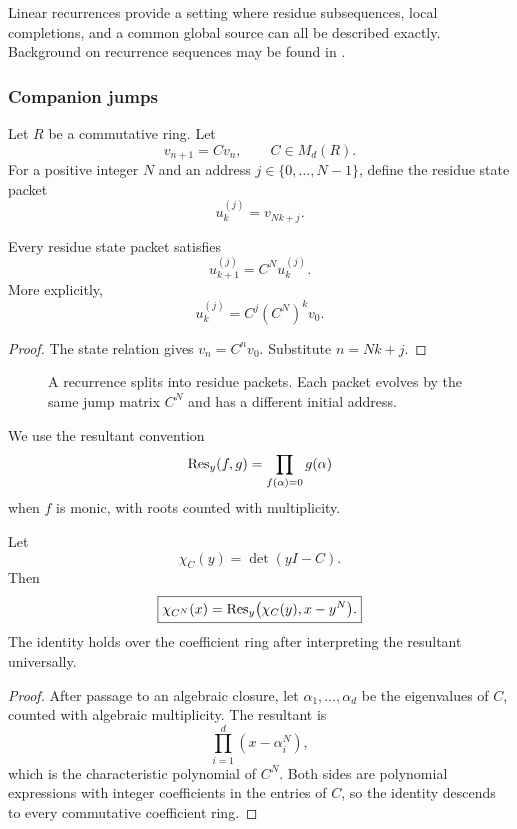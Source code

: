 Linear recurrences provide a setting where residue subsequences, local completions, and a common global source can all be described exactly. Background on recurrence sequences may be found in \cite{EverestVanDerPoortenShparlinskiWard2003,Stanley2012}.

\subsubsection{Companion jumps}

Let \(R\) be a commutative ring. Let
\[
v_{n+1}=Cv_n,
\qquad
C\in M_d(R).
\]
For a positive integer \(N\) and an address \(j\in\{0,\ldots,N-1\}\), define the residue state packet
\[
u_k^{(j)}=v_{Nk+j}.
\]

\begin{histtheorem}\label{hist:thm:companion_jump}
Every residue state packet satisfies
\[
\boxed{
u_{k+1}^{(j)}=C^Nu_k^{(j)}.}
\]
More explicitly,
\[
\boxed{
u_k^{(j)}=C^j(C^N)^kv_0.}
\]
\end{histtheorem}

\begin{proof}
The state relation gives \(v_n=C^nv_0\). Substitute \(n=Nk+j\).
\end{proof}

\begin{figure}[t]
\centering
{}
\caption{A recurrence splits into residue packets. Each packet evolves by the same jump matrix \(C^N\) and has a different initial address.}
\label{hist:fig:recurrence_packets}
\end{figure}

We use the resultant convention
\[
\operatorname{Res}_y(f,g)
=
\prod_{f(\alpha)=0}g(\alpha)
\]
when \(f\) is monic, with roots counted with multiplicity.

\begin{histtheorem}\label{hist:thm:jump_characteristic}
Let
\[
\chi_C(y)=\det(yI-C).
\]
Then
\[
\boxed{
\chi_{C^N}(x)
=
\operatorname{Res}_y\bigl(\chi_C(y),x-y^N\bigr).
}
\]
The identity holds over the coefficient ring after interpreting the resultant universally.
\end{histtheorem}

\begin{proof}
After passage to an algebraic closure, let \(\alpha_1,\ldots,\alpha_d\) be the eigenvalues of \(C\), counted with algebraic multiplicity. The resultant is
\[
\prod_{i=1}^{d}(x-\alpha_i^N),
\]
which is the characteristic polynomial of \(C^N\). Both sides are polynomial expressions with integer coefficients in the entries of \(C\), so the identity descends to every commutative coefficient ring.
\end{proof}

